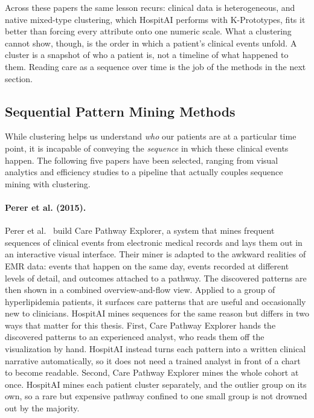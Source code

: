 Across these papers the same lesson recurs: clinical data is heterogeneous, and native mixed-type clustering, which HospitAI performs with K-Prototypes, fits it better than forcing every attribute onto one numeric scale.
What a clustering cannot show, though, is the order in which a patient's clinical events unfold. A cluster is a snapshot of who a patient is, not a timeline of what happened to them.
Reading care as a sequence over time is the job of the methods in the next section.

\subsection{Sequential Pattern Mining Methods}\label{sec:rw_sequences}

While clustering helps us understand \emph{who} our patients are at a particular time point, it is incapable of conveying the \emph{sequence} in which these clinical events happen.
The following five papers have been selected, ranging from visual analytics and efficiency studies to a pipeline that actually couples sequence mining with clustering.

\paragraph{Perer et al. (2015).}
Perer et al.~\cite{perer2015} build Care Pathway Explorer, a system that mines frequent sequences of clinical events from electronic medical records and lays them out in an interactive visual interface.
Their miner is adapted to the awkward realities of EMR data: events that happen on the same day, events recorded at different levels of detail, and outcomes attached to a pathway. The discovered patterns are then shown in a combined overview-and-flow view.
Applied to a group of hyperlipidemia patients, it surfaces care patterns that are useful and occasionally new to clinicians.
HospitAI mines sequences for the same reason but differs in two ways that matter for this thesis.
First, Care Pathway Explorer hands the discovered patterns to an experienced analyst, who reads them off the visualization by hand. HospitAI instead turns each pattern into a written clinical narrative automatically, so it does not need a trained analyst in front of a chart to become readable.
Second, Care Pathway Explorer mines the whole cohort at once. HospitAI mines each patient cluster separately, and the outlier group on its own, so a rare but expensive pathway confined to one small group is not drowned out by the majority.

